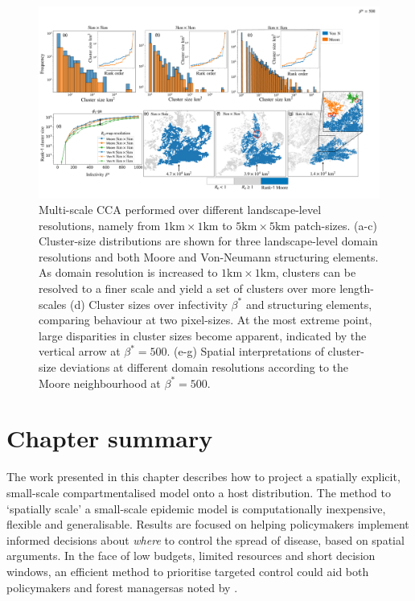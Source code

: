 \begin{landscape}
\begin{figure}
    \centering
    \includegraphics[scale=0.395]{chapter6/figures/fig6-ga-cluster-distribution.pdf} 
    \caption{Multi-scale CCA performed over different landscape-level resolutions, namely from $\mathrm{1km \times 1km}$ to $\mathrm{5km \times 5km}$ patch-sizes. (a-c) Cluster-size distributions are shown for three landscape-level domain resolutions and both Moore and Von-Neumann structuring elements. As domain resolution is increased to $\mathrm{1km \times 1km}$, clusters can be resolved to a finer scale and yield a set of clusters over more length-scales (d) Cluster sizes over infectivity $\beta^*$ and structuring elements, comparing behaviour at two pixel-sizes. At the most extreme point, large disparities in cluster sizes become apparent, indicated by the vertical arrow at $\beta^*=500$. (e-g) Spatial interpretations of cluster-size deviations at different domain resolutions according to the Moore neighbourhood at $\beta^*=500$.}
    \label{fig:gaussian-clustering}
\end{figure}
\end{landscape}

\section{Chapter summary}

The work presented in this chapter describes how to project a spatially explicit, small-scale compartmentalised model onto a host distribution.
The method to `spatially scale' a small-scale epidemic model is computationally inexpensive, flexible and generalisable.
Results are focused on helping policymakers implement informed decisions about \textit{where} to control the spread of disease, based on spatial arguments.
In the face of low budgets, limited resources and short decision windows, an efficient method to prioritise targeted control could aid both policymakers and forest managers\textemdash as noted by \cite{13-challenges, time-varying-infectivity}.

